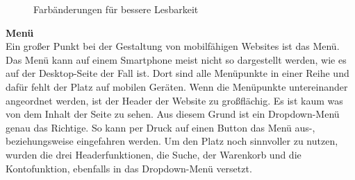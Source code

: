 \begin{figure}[H]
\begin{center}
\caption{Farbänderungen für bessere Lesbarkeit}
\end{center}
\end{figure}
\textbf{Menü}
\\
Ein großer Punkt bei der Gestaltung von mobilfähigen Websites ist das Menü. Das Menü kann auf einem Smartphone meist nicht so dargestellt werden, wie es auf der Desktop-Seite der Fall ist. Dort sind alle Menüpunkte in einer Reihe und dafür fehlt der Platz auf mobilen Geräten. Wenn die Menüpunkte untereinander angeordnet werden, ist der Header der Website zu großflächig. Es ist kaum was von dem Inhalt der Seite zu sehen. Aus diesem Grund ist ein Dropdown-Menü genau das Richtige. So kann per Druck auf einen Button das Menü aus-, beziehungsweise eingefahren werden. Um den Platz noch sinnvoller zu nutzen, wurden die drei Headerfunktionen, die Suche, der Warenkorb und die Kontofunktion, ebenfalls in das Dropdown-Menü versetzt.

